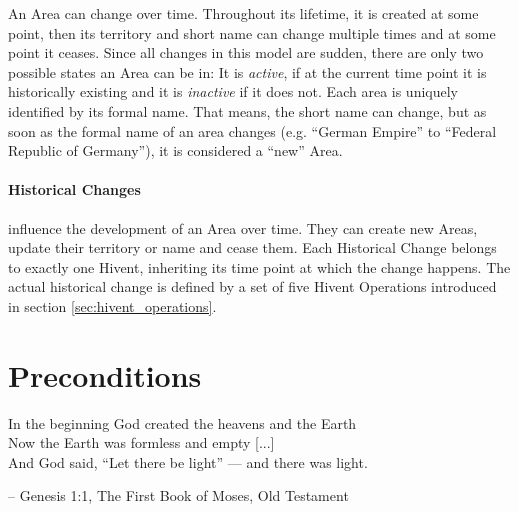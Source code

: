 An Area can change over time. Throughout its lifetime, it is created at some point, then its territory and short name can change multiple times and at some point it ceases. Since all changes in this model are sudden, there are only two possible states an Area can be in: It is \emph{active}, if at the current time point it is historically existing and it is \emph{inactive} if it does not. Each area is uniquely identified by its formal name. That means, the short name can change, but as soon as the formal name of an area changes (e.g. ``German Empire'' to ``Federal Republic of Germany''), it is considered a ``new'' Area.



\paragraph{Historical Changes} %
\label{par:historical_changes}

influence the development of an Area over time. They can create new Areas, update their territory or name and cease them. Each Historical Change belongs to exactly one Hivent, inheriting its time point at which the change happens.  The actual historical change is defined by a set of five Hivent Operations introduced in section \ref{sec:hivent_operations}.



\section{Preconditions} %
\label{sec:preconditions}

\begin{quoteit}
In the beginning God created the heavens and the Earth \\
Now the Earth was formless and empty [...] \\
And God said, “Let there be light” --- and there was light.
\end{quoteit}
\hfill -- Genesis 1:1, The First Book of Moses, Old Testament

